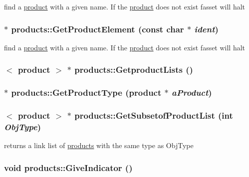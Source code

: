 find a \hyperlink{classproduct}{product} with a given name. If the \hyperlink{classproduct}{product} does not exist fasset will halt \hypertarget{classproducts_a9381e599dba699b633f183cb66c7ba12}{
\subsubsection[{GetProductElement}]{ $\ast$ products::GetProductElement (const char $\ast$ {\em ident})}}
\label{classproducts_a9381e599dba699b633f183cb66c7ba12}
find a \hyperlink{classproduct}{product} with a given name. If the \hyperlink{classproduct}{product} does not exist fasset will halt \hypertarget{classproducts_aab079f48661f64c4771d87f3d867baa8}{
\subsubsection[{GetproductLists}]{$<$ {\bf product} $>$ $\ast$ products::GetproductLists ()}}
\label{classproducts_aab079f48661f64c4771d87f3d867baa8}
\hypertarget{classproducts_a9f4a3b9df4fac4f10e004bcca01fa2a0}{
\subsubsection[{GetProductType}]{ $\ast$ products::GetProductType ({\bf product} $\ast$ {\em aProduct})}}
\label{classproducts_a9f4a3b9df4fac4f10e004bcca01fa2a0}
\hypertarget{classproducts_a0396e9f7c6e68510fb507a7af74bc5bc}{
\subsubsection[{GetSubsetofProductList}]{$<$ {\bf product} $>$ $\ast$ products::GetSubsetofProductList (int {\em ObjType})}}
\label{classproducts_a0396e9f7c6e68510fb507a7af74bc5bc}
returns a link list of \hyperlink{classproducts}{products} with the same type as ObjType \hypertarget{classproducts_af5ff2786f9e1eb1131408cd8d7bd6029}{
\subsubsection[{GiveIndicator}]{\setlength{\rightskip}{0pt plus 5cm}void products::GiveIndicator ()}}

